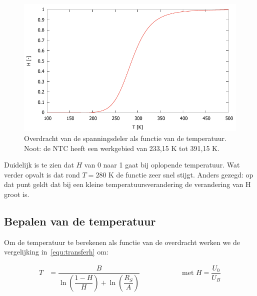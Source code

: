 \documentclass[12pt,a4paper,final,twoside,fleqn]{article}
\let\oldcdot\cdot
\renewcommand{\cdot}{\kern-.10em\oldcdot\kern-.10em}
\begin{document}
\begin{figure}[ht!]
\centering
\includegraphics[scale=1]{gnuplot/transferfunctionH}
\caption[Overdracht van de spanningsdeler als functie van de temperatuur]{Overdracht van de spanningsdeler als functie van de temperatuur. Noot:
de NTC heeft een werkgebied van 233,15 K tot 391,15 K.}
\label{fig:transferfunctionz}
\end{figure}

Duidelijk is te zien dat $H$ van 0 naar 1 gaat bij oplopende temperatuur.
Wat verder opvalt is dat rond $T = 280$ K de functie zeer snel stijgt. Anders
gezegd: op dat punt geldt dat bij een kleine temperatuursverandering de verandering
van H groot is.

\subsection{Bepalen van de temperatuur}
Om de temperatuur te berekenen als functie van de overdracht werken we de
vergelijking in~\eqref{equ:transferh} om:

\begin{equation}
\label{equ:transferT}
\begin{split}
T  &= \dfrac{B}{\ln\left(\dfrac{1-H}{H}\right)+\ln\left(\dfrac{R_S}{A}\right)}\qquad\qquad\qquad\text{met }H = \dfrac{U_0}{U_B}
\end{split}
\end{equation}
\end{document}
